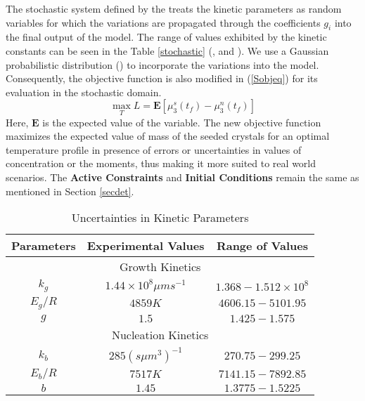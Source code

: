 \documentclass[3p,times,authoryear]{elsarticle}
\begin{document}
The stochastic system defined by the  treats the kinetic parameters as random variables for which the variations are propagated through the coefficients $g_{i}$ into the final output of the model. The range of values exhibited by the kinetic constants can be seen in the Table \ref{stochastic} (\cite{hu}, \cite{shi} and \cite{paeng}). We use a Gaussian probabilistic distribution (\cite{yenkie}) to incorporate the variations into the model. Consequently, the objective function is also modified in (\ref{Sobjeq}) for its evaluation in the stochastic domain.   
\begin{equation} 
\max_{T} L = \mathbf{E}\left[ \mu_{3}^{s}(t_{f}) - \mu_{3}^{n}(t_{f})\right] \label{Sobjeq}
\end{equation}
Here, $\mathbf{E}$ is the expected value of the variable. The new objective function
maximizes the expected value of mass of the seeded crystals for an optimal temperature profile in presence of errors or uncertainties in values of concentration or the moments, thus making it more suited to real world scenarios. The \textbf{Active Constraints} and \textbf{Initial Conditions} remain the same as mentioned in Section \ref{secdet}.

\begin{center}
\begin{table}[!h]
\centering
\caption{Uncertainties in Kinetic Parameters}  \label{stochastic}
\begin{tabular}{|c|c|c|} 
\hline
Parameters & Experimental Values & Range of Values\\
\hline
\multicolumn{3}{|c|}{Growth Kinetics} \\
\hline
$k_{g}$ & $1.44\times10^{8} \mu m s^{-1}$ & $1.368 - 1.512\times10^{8} $\\
$E_{g}/R$ & $4859K$ & $4606.15-5101.95$\\
$g$ & $1.5$ & $1.425-1.575$\\
\hline
\multicolumn{3}{|c|}{Nucleation Kinetics} \\
\hline
$k_{b}$ & $285 (s \mu m^{3})^{-1}$ & $270.75-299.25$\\ 
$E_{b}/R$ & $7517K$ & $7141.15-7892.85$\\
$b$ & $1.45$ & $1.3775-1.5225$\\
\hline
\end{tabular}

\label{Table3}
\end{table}
\end{center}
\end{document}
